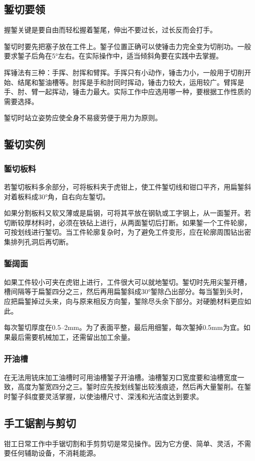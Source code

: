 \documentclass{ctexbook}
\begin{document}
\subsection{錾切要领}
握錾关键是要自由而轻松握着錾尾，伸出不要过长，过长反而会打手。

錾切时要先把塞子放在工件上。錾子位置正确可以使锤击力完全变为切削功。一般要求錾子后角在5°左右。在实际操作中，适当倾斜角要在实践中去掌握。

挥锤法有三种：手挥、肘挥和臂挥。手挥只有小动作，锤击力小，一般用于切削开始、结尾和錾油槽等。肘挥是手和肘同时挥动，锤击力较大，运用较广。臂挥是手、肘、臂一起挥动，锤击力最大。实际工作中应选用哪一种，要根据工作性质的需要选择。

錾切时站立姿势应使全身不易疲劳便于用力为原则。
\subsection{錾切实例}
\subsubsection{錾切板料}
若錾切板料多余部分，可将板料夹于虎钳上，使工件錾切线和钳口平齐，用扁錾斜对着板料成30°角，自右向左錾切。

如果分割板料又软又薄或是扁钢，可将其平放在钢轨或工字钢上，从一面錾开。若切断较厚材料时，必须在铁砧上进行，从两面錾切后打断。如果錾一个工件轮廓，可按划线进行錾切。当工件轮廓复杂时，为了避免工件变形，应在轮廓周围钻出密集排列孔洞后再切断。
\subsubsection{錾阔面}
如果工件较小可夹在虎钳上进行，工件很大可以就地錾切。錾切时先用尖錾开槽，槽间隔等于扁錾四分之三，然后再用扁錾斜成30°錾除凸出部分。每当錾到头时，应把扁錾掉过头来，向与原来相反方向錾，錾除尽头余下部分。对硬脆材料更应如此。

每次錾切厚度在0.5--2mm。为了表面平整，最后用细錾，每次錾掉0.5mm为宜。如果最后需要机械加工，还需留出加工余量。
\subsubsection{开油槽}
在无法用铳床加工油槽时可用油槽錾子开油槽。油槽錾刃口宽度要和油槽宽度一致，高度为錾宽四分之三。錾时应先按划线錾出较浅痕迹，然后再大量錾削。在錾时錾子斜度要灵活掌握，以使油槽尺寸、深浅和光洁度达到要求。
\subsection{手工锯割与剪切}
钳工日常工作中手锯切割和手剪剪切是常见操作。因为它方便、简单、灵活，不需要任何辅助设备，不消耗能源。
\end{document}
